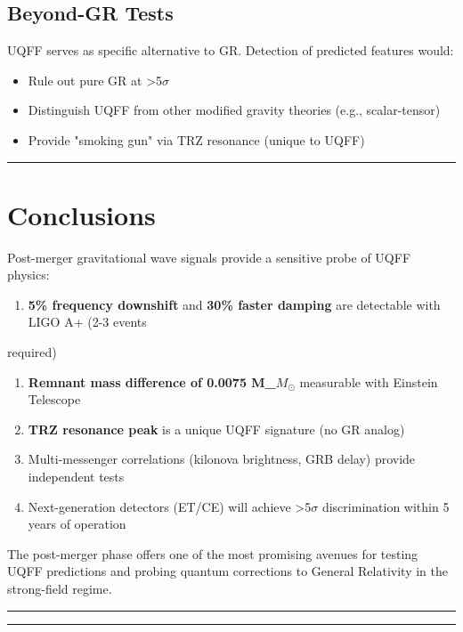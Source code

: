 \documentclass[12pt,a4paper]{article}
\begin{document}
\subsection{Beyond-GR Tests}

UQFF serves as specific alternative to GR. Detection of predicted features would:

\begin{itemize}
  \item Rule out pure GR at >5$\sigma$
  \item Distinguish UQFF from other modified gravity theories (e.g., scalar-tensor)
  \item Provide "smoking gun" via TRZ resonance (unique to UQFF)
\end{itemize}

\medskip\hrule\medskip

\section{Conclusions}

Post-merger gravitational wave signals provide a sensitive probe of UQFF physics:

\begin{enumerate}
  \item \textbf{5\% frequency downshift} and \textbf{30\% faster damping} are detectable with LIGO A+ (2-3 events
\end{enumerate}

required)

\begin{enumerate}
  \item \textbf{Remnant mass difference of 0.0075 M\_{$M_{\odot}$}} measurable with Einstein Telescope
  \item \textbf{TRZ resonance peak} is a unique UQFF signature (no GR analog)
  \item Multi-messenger correlations (kilonova brightness, GRB delay) provide independent tests
  \item Next-generation detectors (ET/CE) will achieve >5$\sigma$ discrimination within 5 years of operation
\end{enumerate}

The post-merger phase offers one of the most promising avenues for testing UQFF predictions and probing quantum corrections to General Relativity in the strong-field regime.

\medskip\hrule\medskip

\medskip\hrule\medskip
\end{document}
